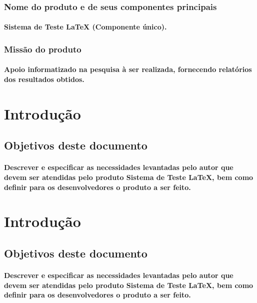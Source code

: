 \documentclass{article}
\begin{document}
		\subsubsection{Nome do produto e de seus componentes principais}
			\paragraph{Sistema de Teste LaTeX (Componente único). }
		\subsubsection{Missão do produto}
			\paragraph{Apoio informatizado na pesquisa à ser realizada, fornecendo relatórios dos resultados obtidos.}

			
\newpage

\section{Introdução}
	\subsection{Objetivos deste documento}
		\paragraph{Descrever e especificar as necessidades levantadas pelo autor que devem ser atendidas pelo produto Sistema de Teste LaTeX, bem como definir para os desenvolvedores o produto a ser feito.}


\newpage

\section{Introdução}
	\subsection{Objetivos deste documento}
		\paragraph{Descrever e especificar as necessidades levantadas pelo autor que devem ser atendidas pelo produto Sistema de Teste LaTeX, bem como definir para os desenvolvedores o produto a ser feito.}
\end{document}
